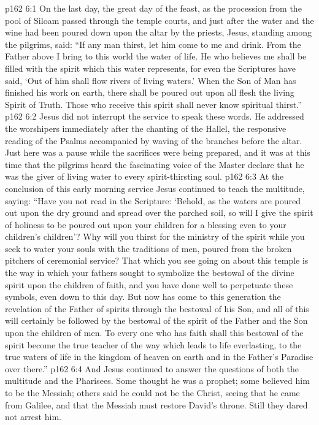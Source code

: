 \vs p162 6:1 On the last day, the great day of the feast, as the procession from the pool of Siloam passed through the temple courts, and just after the water and the wine had been poured down upon the altar by the priests, Jesus, standing among the pilgrims, said: \textcolor{ubdarkred}{“If any man thirst, let him come to me and drink. From the Father above I bring to this world the water of life. He who believes me shall be filled with the spirit which this water represents, for even the Scriptures have said, ‘Out of him shall flow rivers of living waters.’ When the Son of Man has finished his work on earth, there shall be poured out upon all flesh the living Spirit of Truth. Those who receive this spirit shall never know spiritual thirst.”}
\vs p162 6:2 Jesus did not interrupt the service to speak these words. He addressed the worshipers immediately after the chanting of the Hallel, the responsive reading of the Psalms accompanied by waving of the branches before the altar. Just here was a pause while the sacrifices were being prepared, and it was at this time that the pilgrims heard the fascinating voice of the Master declare that he was the giver of living water to every spirit\hyp{}thirsting soul.
\vs p162 6:3 At the conclusion of this early morning service Jesus continued to teach the multitude, saying: \textcolor{ubdarkred}{“Have you not read in the Scripture: ‘Behold, as the waters are poured out upon the dry ground and spread over the parched soil, so will I give the spirit of holiness to be poured out upon your children for a blessing even to your children’s children’? Why will you thirst for the ministry of the spirit while you seek to water your souls with the traditions of men, poured from the broken pitchers of ceremonial service? That which you see going on about this temple is the way in which your fathers sought to symbolize the bestowal of the divine spirit upon the children of faith, and you have done well to perpetuate these symbols, even down to this day. But now has come to this generation the revelation of the Father of spirits through the bestowal of his Son, and all of this will certainly be followed by the bestowal of the spirit of the Father and the Son upon the children of men. To every one who has faith shall this bestowal of the spirit become the true teacher of the way which leads to life everlasting, to the true waters of life in the kingdom of heaven on earth and in the Father’s Paradise over there.”}
\vs p162 6:4 And Jesus continued to answer the questions of both the multitude and the Pharisees. Some thought he was a prophet; some believed him to be the Messiah; others said he could not be the Christ, seeing that he came from Galilee, and that the Messiah must restore David’s throne. Still they dared not arrest him.
